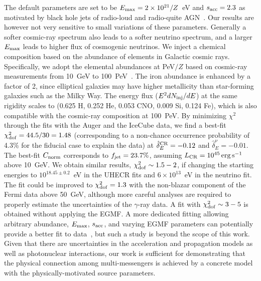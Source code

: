 \documentclass[aps,prd,onecolumn,superscriptaddress,11pt]{revtex4}
\begin{document}
The default parameters are set to be $E_{\rm max} = 2\times10^{21}/Z$~eV and $s_{\rm acc}=2.3$ as motivated by black hole jets of radio-loud and radio-quite AGN~\cite{2012ApJ...749...63M,Peer:2009vnw}. Our results are however not very sensitive to small variations of these parameters. Generally a softer cosmic-ray spectrum also leads to a softer neutrino spectrum, and a larger $E_{\rm max}$ leads to higher flux of cosmogenic neutrinos.  
We inject a chemical composition based on the abundance of elements in Galactic cosmic rays. Specifically, we adopt the elemental abundances at PeV$/Z$ based on cosmic-ray measurements from 10~GeV to 100~PeV~\cite{2003APh....19..193H}. The iron abundance is enhanced by a factor of 2, since elliptical galaxies may have higher metallicity than star-forming galaxies such as the Milky Way. The energy flux ($E^2dN_{\rm inj}/dE$) at the same rigidity scales to (0.625 H, 0.252 He, 0.053 CNO, 0.009 Si, 0.124 Fe), which is also compatible with the cosmic-ray composition at 100~PeV. 
By minimizing $\chi^2$ through the fits with the Auger and the IceCube data, we find a best-fit $\chi^2_{\rm dof}=44.5/ 30=1.48$ (corresponding to a non-chance occurrence probability of 4.3\% for the fiducial case to explain the data) at $\hat{\delta}_E^{\rm CR}=-0.12$ and $\hat{\delta}_E^\nu=-0.01$. The best-fit $C_{\rm norm}$ corresponds to $f_{\rm jet}=23.7\%$, assuming $L_{\rm CR} = 10^{45}\,\rm erg\,{\rm s}^{-1}$ above 10~GeV. We obtain similar results, $\chi^2_{\rm dof}\sim1.5-2$, if changing the starting energies to $10^{18.45\pm0.2}$~eV in the UHECR fits and $6\times{10}^{13}$~eV in the neutrino fit. The fit could be improved to $\chi^2_{\rm dof}=1.3$ with the non-blazar component of the Fermi data above 50~GeV, although more careful analyses are required to properly estimate the uncertainties of the $\gamma$-ray data. A fit with $\chi^2_{\rm dof} \sim 3-5$ is obtained without applying the EGMF. 
 A more dedicated fitting allowing arbitrary abundance, $E_{\rm max}$, $s_{\rm acc}$, and varying EGMF parameters can potentially provide a better fit to data~\cite{2016arXiv161207155T, Wittkowski:2017okb}, but such a study is beyond the scope of this work. Given that there are uncertainties in the acceleration and propagation models as well as photonuclear interactions, our work is sufficient for demonstrating that the physical connection among multi-messengers is achieved by a concrete model with the physically-motivated source parameters.
\end{document}
